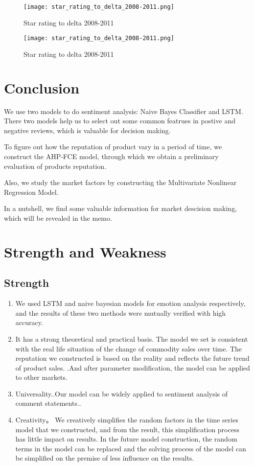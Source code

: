 \documentclass{mcmthesis}
\begin{document}
\begin{figure}[!h]
  \small
  \centering
  \texttt{[image: star\_rating\_to\_delta\_2008-2011.png]}
  \caption{Star rating to delta 2008-2011} %
\end{figure}

\begin{figure}[!h]
  \small
  \centering
  \texttt{[image: star\_rating\_to\_delta\_2008-2011.png]}
  \caption{Star rating to delta 2008-2011} %
\end{figure}



\section{Conclusion}
  We use two models to do sentiment analysis: Naive Bayes Classifier and LSTM. There two models help us to select out some common featrues in postive and negative reviews, which is valuable for decision making. 

  To figure out how the reputation of product vary in a period of time, we construct the AHP-FCE model, through which we obtain a preliminary evaluation of products reputation.

  Also, we study the market factors by constructing the Multivariate Nonlinear Regression Model.

  In a nutshell, we find some valuable information for market descision making, which will be revealed in the memo.

  \section{Strength and Weakness}

  \subsection{Strength}
  
  \begin{enumerate}
  \item We used LSTM and naive bayesian models for emotion analysis respectively, and the results of these two methods were mutually verified with high accuracy.
  \item It has a strong theoretical and practical basis. The model we set is consistent with the real life situation of the change of commodity sales over time. The reputation we constructed is based on the reality and reflects the future trend of product sales. .And after parameter modification, the model can be applied to other markets.
  \item Universality..Our model can be widely applied to sentiment analysis of comment statements..
  \item Creativity。 We creatively simplifies the random factors in the time series model that we constructed, and from the result, this simplification process has little impact on results. In the future model construction, the random terms in the model can be replaced and the solving process of the model can be simplified on the premise of less influence on the results. 
  \end{enumerate}
  
\end{document}
